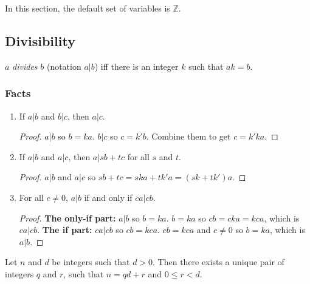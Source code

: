 \documentclass[11pt]{article}
\begin{document}
In this section, the default set of variables is $\mathbb{Z}$.

\subsection{Divisibility}

\begin{definition}
$a$ \emph{divides} $b$ (notation $a|b$) iff there is an integer $k$ such that $ak=b$.
\end{definition}

\subsubsection{Facts}

\begin{enumerate}
\item If $a|b$ and $b|c$, then $a|c$.
\begin{proof}
$a|b$ so $b=ka$. $b|c$ so $c=k'b$. Combine them to get $c=k'ka$.
\end{proof}

\item If $a|b$ and $a|c$, then $a|sb+tc$ for all $s$ and $t$.
\begin{proof}
$a|b$ and $a|c$ so $sb+tc=ska+tk'a=(sk+tk')a$.
\end{proof}

\item For all $c \neq 0$, $a|b$ if and only if $ca|cb$.
\begin{proof}
\textbf{The only-if part:} $a|b$ so $b=ka$. $b=ka$ so $cb=cka=kca$, which is $ca|cb$.
\textbf{The if part:} $ca|cb$ so $cb=kca$. $cb=kca$ and $c \neq 0$ so $b=ka$, which is
$a|b$.
\end{proof}

\end{enumerate}

\begin{theorem}
Let $n$ and $d$ be integers such that $d > 0$. Then there exists a unique pair of integers
$q$ and $r$, such that $n = qd+r$ and $0 \leq r < d$.
\end{theorem}
\end{document}
